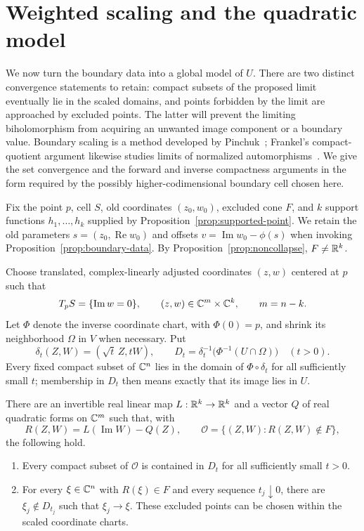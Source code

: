 \section{Weighted scaling and the quadratic model}
\label{sec:scaling}

We now turn the boundary data into a global model of $U$.  There are two
distinct convergence statements to retain: compact subsets of the proposed
limit eventually lie in the scaled domains, and points forbidden by the
limit are approached by excluded points.  The latter will prevent the
limiting biholomorphism from acquiring an unwanted image component or a
boundary value.
Boundary scaling is a method developed by
Pinchuk~\cite[Section~2, pp.~73--75]{Pinchuk1981};
Frankel's compact-quotient argument likewise studies limits of normalized
automorphisms~\cite[Section~3]{Frankel1989}. We give the set convergence
and the forward and inverse compactness arguments in the form required
by the possibly higher-codimensional boundary cell chosen here.

Fix the point $p$, cell $S$, old coordinates $(z_0,w_0)$, excluded cone $F$,
and $k$ support functions $h_1,\ldots,h_k$ supplied by
Proposition~\ref{prop:supported-point}.  We retain the old parameters
$s=(z_0,\operatorname{Re}w_0)$ and offsets
$v=\operatorname{Im}w_0-\phi(s)$ when invoking
Proposition~\ref{prop:boundary-data}.  By
Proposition~\ref{prop:noncollapse}, $F\ne\mathbb R^k$.

Choose translated, complex-linearly adjusted coordinates $(z,w)$ centered
at $p$ such that
\[
 T_pS=\{\operatorname{Im}w=0\},
 \qquad (z,w)\in\mathbb C^m\times\mathbb C^k,\qquad m=n-k.
\]
Let $\Phi$ denote the inverse coordinate chart, with $\Phi(0)=p$, and
shrink its neighborhood $\Omega$ in $V$ when necessary.  Put
\[
 \delta_t(Z,W)=(\sqrt t\,Z,tW),\qquad
 D_t=\delta_t^{-1}\bigl(\Phi^{-1}(U\cap\Omega)\bigr)
 \quad(t>0).
\]
Every fixed compact subset of $\mathbb C^n$ lies in the domain of
$\Phi\circ\delta_t$ for all sufficiently small $t$; membership in $D_t$
then means exactly that its image lies in $U$.

\begin{proposition}
\label{prop:scaling-limit}
There are an invertible real linear map $L:\mathbb R^k\to\mathbb R^k$ and a vector
$Q$ of real quadratic forms on $\mathbb C^m$ such that, with
\[
 R(Z,W)=L(\operatorname{Im}W)-Q(Z),\qquad
 \mathcal O=\{(Z,W):R(Z,W)\notin F\},
\]
the following hold.
\begin{enumerate}[label=\textup{(\roman*)}]
\item Every compact subset of $\mathcal O$ is contained in $D_t$ for all
sufficiently small $t>0$.
\item For every $\xi\in\mathbb C^n$ with $R(\xi)\in F$ and every sequence
$t_j\downarrow0$, there are $\xi_j\notin D_{t_j}$ such that
$\xi_j\to\xi$.  These excluded points can be chosen within the scaled
coordinate charts.
\end{enumerate}
\end{proposition}

